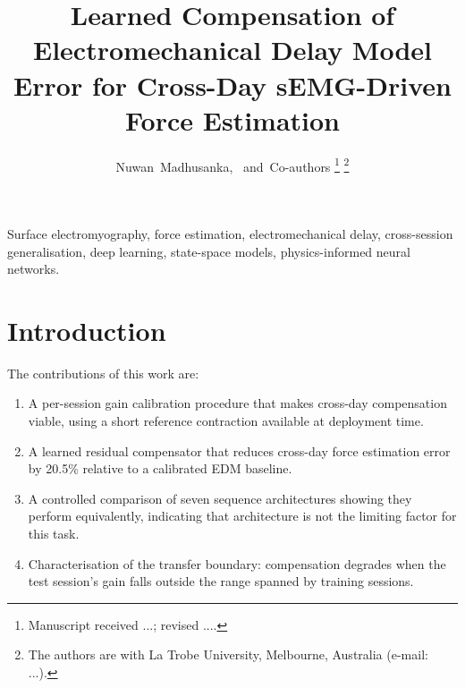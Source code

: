 \documentclass[journal]{IEEEtran}
\begin{document}
\title{Learned Compensation of Electromechanical Delay Model Error for
Cross-Day sEMG-Driven Force Estimation}

\author{Nuwan~Madhusanka,~\IEEEmembership{}
        and~Co-authors%
\thanks{Manuscript received ...; revised ....}%
\thanks{The authors are with La Trobe University, Melbourne, Australia
(e-mail: ...).}}

\maketitle

\begin{abstract}
\end{abstract}

\begin{IEEEkeywords}
Surface electromyography, force estimation, electromechanical delay,
cross-session generalisation, deep learning, state-space models,
physics-informed neural networks.
\end{IEEEkeywords}

\IEEEpeerreviewmaketitle

\section{Introduction}
\label{sec:intro}

The contributions of this work are:
\begin{enumerate}
  \item A per-session gain calibration procedure that makes cross-day
        compensation viable, using a short reference contraction available at
        deployment time.
  \item A learned residual compensator that reduces cross-day force estimation
        error by 20.5\% relative to a calibrated EDM baseline.
  \item A controlled comparison of seven sequence architectures showing they
        perform equivalently, indicating that architecture is not the limiting
        factor for this task.
  \item Characterisation of the transfer boundary: compensation degrades when
        the test session's gain falls outside the range spanned by training
        sessions.
\end{enumerate}
\end{document}

